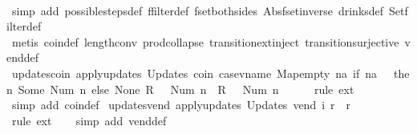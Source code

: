 \begin{isabellebody}
%
\isadelimproof
\ \ %
\endisadelimproof
%
\isatagproof
{}\isamarkupfalse%
\ {\isacharparenleft}simp\ add{\isacharcolon}\ possible{\isacharunderscore}steps{\isacharunderscore}def\ ffilter{\isacharunderscore}def\ fset{\isacharunderscore}both{\isacharunderscore}sides\ Abs{\isacharunderscore}fset{\isacharunderscore}inverse\ drinks{\isacharunderscore}def\ Set{\isachardot}filter{\isacharunderscore}def{\isacharparenright}\isanewline
\ \ \isamarkupfalse%
\ {\isacharparenleft}metis\ coin{\isacharunderscore}def\ length{\isacharunderscore}{}{\isacharunderscore}conv\ prod{\isachardot}collapse\ transition{\isachardot}ext{\isacharunderscore}inject\ transition{\isachardot}surjective\ vend{\isacharunderscore}def{\isacharparenright}%
\endisatagproof
{\isafoldproof}%
%
\isadelimproof
\isanewline
%
\endisadelimproof
\isanewline
{}\isamarkupfalse%
\ updates{\isacharunderscore}coin{\isacharcolon}\ {\isachardoublequoteopen}{\isacharparenleft}apply{\isacharunderscore}updates\ {\isacharparenleft}Updates\ coin{\isacharparenright}\ {\isacharparenleft}case{\isacharunderscore}vname\ Map{\isachardot}empty\ {\isacharparenleft}{\isasymlambda}na{\isachardot}\ if\ na\ {\isacharequal}\ {}\ then\ Some\ {\isacharparenleft}Num\ n{\isacharparenright}\ else\ None{\isacharparenright}{\isacharparenright}\ {\isacharless}R\ {}\ {\isacharcolon}{\isacharequal}\ Num\ n{\isachargreater}{\isacharparenright}\ {\isacharequal}\ {\isacharless}R\ {}\ {\isacharcolon}{\isacharequal}\ Num\ {\isacharparenleft}n\ {\isacharplus}\ {}{\isacharparenright}{\isachargreater}{\isachardoublequoteclose}\isanewline
%
\isadelimproof
\ \ %
\endisadelimproof
%
\isatagproof
{}\isamarkupfalse%
\ {\isacharparenleft}rule\ ext{\isacharparenright}\isanewline
\ \ \isamarkupfalse%
\ {\isacharparenleft}simp\ add{\isacharcolon}\ coin{\isacharunderscore}def{\isacharparenright}%
\endisatagproof
{\isafoldproof}%
%
\isadelimproof
\isanewline
%
\endisadelimproof
\isanewline
{}\isamarkupfalse%
\ updates{\isacharunderscore}vend{\isacharcolon}\ {\isachardoublequoteopen}apply{\isacharunderscore}updates\ {\isacharparenleft}Updates\ vend{\isacharparenright}\ i\ r\ {\isacharequal}\ r{\isachardoublequoteclose}\isanewline
%
\isadelimproof
\ \ %
\endisadelimproof
%
\isatagproof
{}\isamarkupfalse%
\ {\isacharparenleft}rule\ ext{\isacharparenright}\isanewline
\ \ \isamarkupfalse%
\ {\isacharparenleft}simp\ add{\isacharcolon}\ vend{\isacharunderscore}def{\isacharparenright}%

\end{isabellebody}
